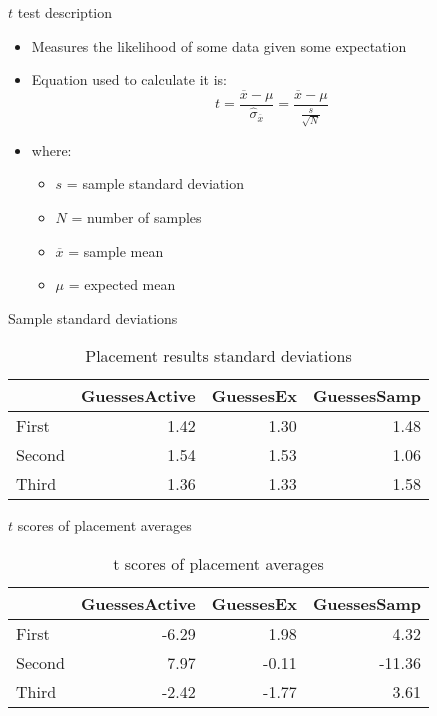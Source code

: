 \documentclass{beamer}
\begin{document}
\begin{frame}{$t$ test description}
  \begin{itemize}
     \item Measures the likelihood of some data given some expectation
     \item Equation used to calculate it is:
       $$t =\frac{\overline{x}-\mu}{\hat{\sigma}_{\overline{x}}} = \frac{\overline{x}-\mu}{\frac{s}{\sqrt{N}}}$$
     \item where:
       \begin{itemize}
          \item $s$ = sample standard deviation
          \item $N$ = number of samples
          \item $\overline{x}$ = sample mean
          \item $\mu$ = expected mean
       \end{itemize}
  \end{itemize}
\end{frame}

\begin{frame}{Sample standard deviations}
\begin{table}
\begin{tabular}{lrrr}
\toprule
{} &  GuessesActive &  GuessesEx &  GuessesSamp \\
\midrule
First  &           1.42 &       1.30 &     1.48 \\
Second &           1.54 &       1.53 &     1.06 \\
Third  &           1.36 &       1.33 &     1.58 \\
\bottomrule
\end{tabular}
\caption{Placement results standard deviations}
\end{table}
\end{frame}

\begin{frame}{$t$ scores of placement averages}
\begin{table}
\begin{tabular}{lrrr}
\toprule
{} &  GuessesActive &  GuessesEx &  GuessesSamp \\
\midrule
First  &      -6.29 &       1.98 &         4.32 \\
Second &       7.97 &      -0.11 &       -11.36 \\
Third  &      -2.42 &      -1.77 &         3.61 \\
\bottomrule
\end{tabular}
\caption{t scores of placement averages}
\end{table}
\end{frame}
\end{document}
